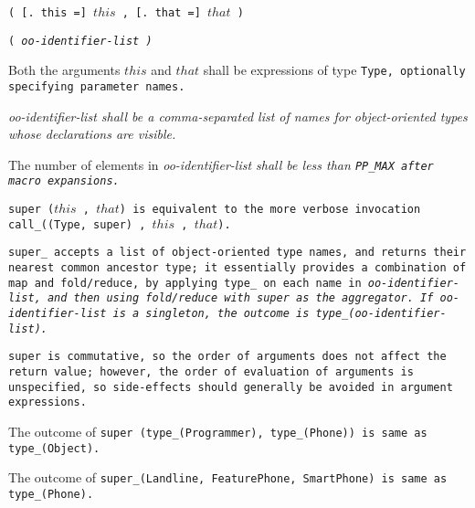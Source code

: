 
\s\s\tt{(} [\tt{. this =}] $this$ \tt{,} [\tt{. that =}] $that$ \tt{)}

\s\tt{(} \it{oo-identifier-list} \tt{)}


Both the arguments $this$ and $that$ shall be expressions
of type \tt{Type}, optionally specifying parameter names.

\it{oo-identifier-list} shall be a comma-separated list of
names for object-oriented types whose declarations are visible.

The number of elements in \it{oo-identifier-list}
shall be less than \tt{PP_MAX} after macro expansions.


\tt{super (}$this$ \tt{,} $that$\tt{)} is equivalent to the more verbose
invocation \tt{call_((Type, super)} \tt{,} $this$ \tt{,} $that$\tt{)}.

\tt{super_} accepts a list of object-oriented type names, and returns their
nearest common ancestor type; it essentially provides a combination of map and
fold/reduce, by applying \tt{type_} on each name in \it{oo-identifier-list},
and then using fold/reduce with \tt{super} as the aggregator.
If \it{oo-identifier-list} is a singleton, the
outcome is \tt{type_(}\it{oo-identifier-list}\tt{)}.

\note \tt{super} is commutative, so the order of arguments does not affect the
return value; however, the order of evaluation of arguments is unspecified,
so side-effects should generally be avoided in argument expressions.

\example The outcome of \tt{super (type_(Programmer), type_(Phone))}
is same as \tt{type_(Object)}.

The outcome of \tt{super_(Landline, FeaturePhone, SmartPhone)}
is same as \tt{type_(Phone)}.
